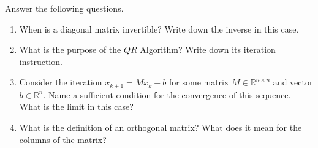 Answer the following questions.
\begin{enumerate}
	\item When is a diagonal matrix invertible? Write down the inverse in this case.
	
	\item What is the purpose of the $QR$ Algorithm? Write down its iteration instruction.
	
	\item Consider the iteration $x_{k+1} = Mx_k + b$ for some matrix $M \in \mathbb{R}^{n \times n}$ and vector $b \in \mathbb{R}^n$. Name a sufficient condition for the convergence of this sequence. What is the limit in this case?

	
	\item What is the definition of an orthogonal matrix? What does it mean for the columns of the matrix?
	
\end{enumerate}
